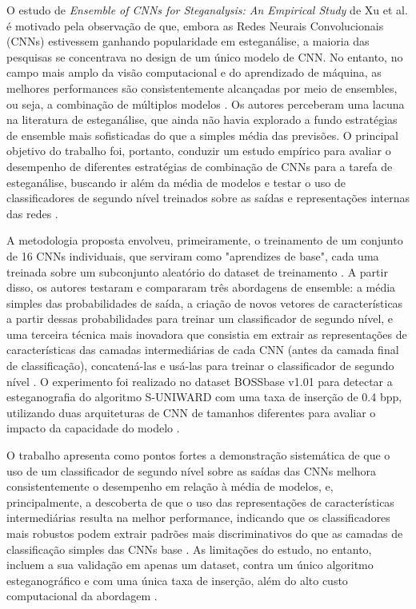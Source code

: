 \documentclass[12pt]{article}
\begin{document}
O estudo de \textit{Ensemble of CNNs for Steganalysis: An Empirical Study} de Xu et al. é motivado pela observação de que, embora as Redes Neurais Convolucionais (CNNs) estivessem ganhando popularidade em esteganálise, a maioria das pesquisas se concentrava no design de um único modelo de CNN. No entanto, no campo mais amplo da visão computacional e do aprendizado de máquina, as melhores performances são consistentemente alcançadas por meio de ensembles, ou seja, a combinação de múltiplos modelos \cite{xu2016ensemble}. Os autores perceberam uma lacuna na literatura de esteganálise, que ainda não havia explorado a fundo estratégias de ensemble mais sofisticadas do que a simples média das previsões. O principal objetivo do trabalho foi, portanto, conduzir um estudo empírico para avaliar o desempenho de diferentes estratégias de combinação de CNNs para a tarefa de esteganálise, buscando ir além da média de modelos e testar o uso de classificadores de segundo nível treinados sobre as saídas e representações internas das redes \cite{xu2016ensemble}.

A metodologia proposta envolveu, primeiramente, o treinamento de um conjunto de 16 CNNs individuais, que serviram como "aprendizes de base", cada uma treinada sobre um subconjunto aleatório do dataset de treinamento \cite{xu2016ensemble}. A partir disso, os autores testaram e compararam três abordagens de ensemble: a média simples das probabilidades de saída, a criação de novos vetores de características a partir dessas probabilidades para treinar um classificador de segundo nível, e uma terceira técnica mais inovadora que consistia em extrair as representações de características das camadas intermediárias de cada CNN (antes da camada final de classificação), concatená-las e usá-las para treinar o classificador de segundo nível \cite{xu2016ensemble}. O experimento foi realizado no dataset BOSSbase v1.01 para detectar a esteganografia do algoritmo S-UNIWARD com uma taxa de inserção de 0.4 bpp, utilizando duas arquiteturas de CNN de tamanhos diferentes para avaliar o impacto da capacidade do modelo \cite{xu2016ensemble}.

O trabalho apresenta como pontos fortes a demonstração sistemática de que o uso de um classificador de segundo nível sobre as saídas das CNNs melhora consistentemente o desempenho em relação à média de modelos, e, principalmente, a descoberta de que o uso das representações de características intermediárias resulta na melhor performance, indicando que os classificadores mais robustos podem extrair padrões mais discriminativos do que as camadas de classificação simples das CNNs base \cite{xu2016ensemble}. As limitações do estudo, no entanto, incluem a sua validação em apenas um dataset, contra um único algoritmo esteganográfico e com uma única taxa de inserção, além do alto custo computacional da abordagem \cite{xu2016ensemble}.
\end{document}
